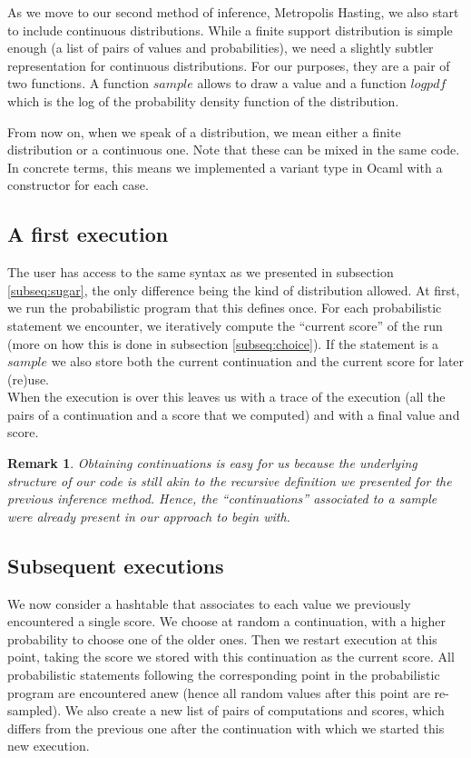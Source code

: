 \documentclass{article}
\newtheorem{remark}{Remark}
\begin{document}
As we move to our second method of inference, Metropolis Hasting, we also start
to include continuous distributions. While a finite support distribution is
simple enough (a list of pairs of values and probabilities), we need a slightly
subtler representation for continuous distributions. For our purposes, they are
a pair of two functions. A function $sample$ allows to draw a value and a
function $logpdf$ which is the log of the probability density function of the
distribution.

From now on, when we speak of a distribution, we mean either a finite
distribution or a continuous one. Note that these can be mixed in the same code.
In concrete terms, this means we implemented a variant type in Ocaml with a
constructor for each case.

\subsection{A first execution}

The user has access to the same syntax as we presented in subsection
\ref{subseq:sugar}, the only difference being the kind of distribution allowed.
At first, we run the probabilistic program that this defines once. For each
probabilistic statement we encounter, we iteratively compute the
``current score'' of the run (more on how this is done in subsection
\ref{subseq:choice}). If the statement is a $sample$ we also store both the
current continuation and the current score for later (re)use. \\

When the execution is over this leaves us with a trace of the execution (all the
pairs of a continuation and a score that we computed) and with a final value and
score.

\begin{remark}
	Obtaining continuations is easy for us because the underlying structure of our
	code is still akin to the recursive definition we presented for the previous
	inference method. Hence, the ``continuations'' associated to a sample were
	already present in our approach to begin with.
\end{remark}

\subsection{Subsequent executions}

We now consider a hashtable that associates to each value we previously
encountered a single score. We choose at random a continuation, with a higher
probability to choose one of the older ones. Then we restart execution at this
point, taking the score we stored with this continuation as the current score.
All probabilistic statements following the corresponding point in the
probabilistic program are encountered anew (hence all random values after
this point are re-sampled). We also create a new list of pairs of computations
and scores, which differs from the previous one after the continuation with
which we started this new execution.
\end{document}
